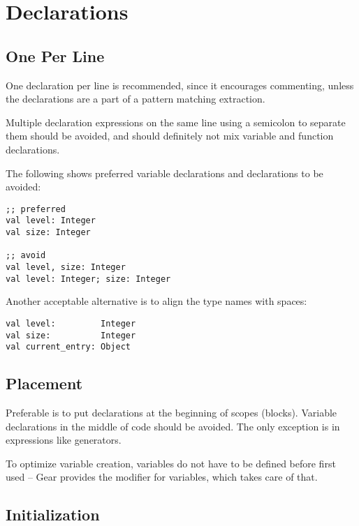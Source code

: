 \section{Declarations}






\subsection{One Per Line}

One declaration per line is recommended, since it encourages commenting, unless the declarations are a part of a pattern matching extraction. 

Multiple declaration expressions on the same line using a semicolon to separate them should be avoided, and should definitely not mix variable and function declarations. 

\example The following shows preferred variable declarations and declarations to be avoided:
\begin{lstlisting}
;; preferred
val level: Integer
val size: Integer

;; avoid
val level, size: Integer
val level: Integer; size: Integer
\end{lstlisting}

\example Another acceptable alternative is to align the type names with spaces: 
\begin{lstlisting}
val level:         Integer
val size:          Integer
val current_entry: Object
\end{lstlisting}





\subsection{Placement}

Preferable is to put declarations at the beginning of scopes (blocks). Variable declarations in the middle of code should be avoided. The only exception is in expressions like generators. 

To optimize variable creation, variables do not have to be defined before first used -- Gear provides the  modifier for variables, which takes care of that. 





\subsection{Initialization}

